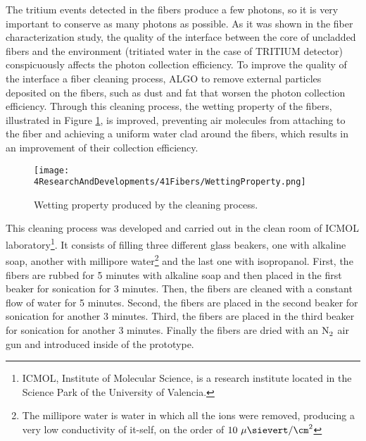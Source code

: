 
The tritium events detected in the fibers produce a few photons, so it is very important to conserve as many photons as possible. As it was shown in the fiber characterization study, the quality of the interface between the core of uncladded fibers and the environment (tritiated water in the case of TRITIUM detector) conspicuously affects the photon collection efficiency. To improve the quality of the interface a fiber cleaning process, ALGO to remove external particles deposited on the fibers, such as dust and fat that worsen the photon collection efficiency.  Through this cleaning process, the wetting property of the fibers, illustrated in Figure \ref{fig:WettingProperty}, is improved, preventing air molecules from attaching to the fiber and achieving a uniform water clad around the fibers, which results in an improvement of their collection efficiency. 


\begin{figure}[h]
\centering
\texttt{[image: 4ResearchAndDevelopments/41Fibers/WettingProperty.png]}
\caption{Wetting property produced by the cleaning process. \cite{WettingProperty}\label{fig:WettingProperty}}
\end{figure}


This cleaning process  was developed and carried out in the clean room of ICMOL laboratory\footnote{ICMOL, Institute of Molecular Science, is a research institute located in the Science Park of the University of Valencia.}. It consists of filling three different glass beakers, one with alkaline soap, another with millipore water\footnote{The millipore water is water in which all the ions were removed, producing a very low conductivity of it-self, on the order of $10~\mu\sievert/\cm^2$} and the last one with isopropanol. First, the fibers are rubbed for 5 minutes with alkaline soap and then placed in the first beaker for sonication for 3 minutes. Then, the fibers are cleaned with a constant flow of water for 5 minutes. Second, the fibers are placed in the second beaker for sonication for another 3 minutes. Third, the fibers are placed in the third beaker for sonication for another 3 minutes. Finally the fibers are dried with an $\ce{N_2}$ air gun and introduced inside of the prototype.

